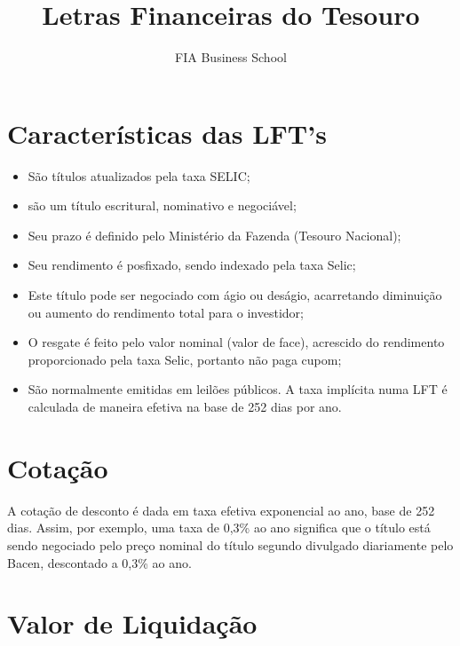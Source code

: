 \documentclass{article}\usepackage[]{graphicx}\usepackage[]{xcolor}
\title{Letras Financeiras do Tesouro}
\author{FIA Business School}
\begin{document}
\maketitle

\section*{Características das LFT's}

\begin{itemize}
  
  \item São títulos atualizados pela taxa SELIC;
  
  \item são um título escritural, nominativo e negociável;
  
  \item Seu prazo é definido pelo Ministério da Fazenda (Tesouro Nacional);
  
  \item Seu rendimento é posfixado, sendo indexado pela taxa Selic;
  
  \item Este título pode ser negociado com ágio ou deságio, acarretando diminuição 
  ou aumento do rendimento total para o investidor;
  
  \item O resgate é feito pelo valor nominal (valor de face), acrescido do rendimento 
  proporcionado pela taxa Selic, portanto não paga cupom;
  
  \item São normalmente emitidas em leilões públicos. A taxa implícita numa LFT é 
  calculada de maneira efetiva na base de 252 dias por ano.

\end{itemize}

\section*{Cotação}

A cotação de desconto é dada em taxa efetiva exponencial ao ano, base de 252 dias. 
Assim, por exemplo, uma taxa de 0,3\% ao ano significa que o título está sendo 
negociado pelo preço nominal do título segundo divulgado diariamente pelo Bacen, 
descontado a 0,3\% ao ano.

\section*{Valor de Liquidação}
\end{document}
